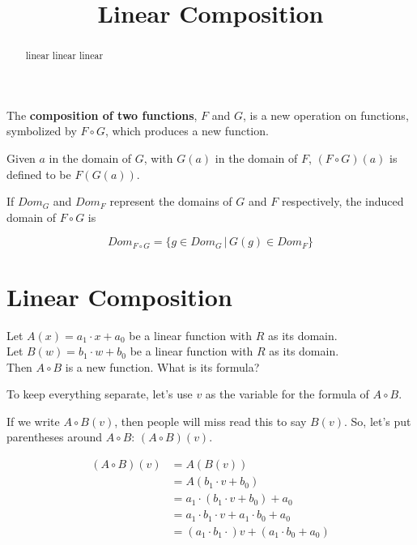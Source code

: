 \documentclass{ximera}
\title{Linear Composition}
\begin{document}
\begin{abstract}
linear linear linear
\end{abstract}
\maketitle


The \textbf{composition of two functions}, $F$ and $G$, is a new operation on functions, symbolized by $F \circ G$, which produces a new function.


\begin{definition}
Given $a$ in the domain of $G$, with $G(a)$ in the domain of $F$, $(F \circ G)(a)$ is defined to be  $F(G(a))$.


If $Dom_G$ and $Dom_F$ represent the domains of $G$ and $F$ respectively, the induced domain of $F \circ G$ is 




\[  Dom_{F \circ G} = \{  g \in  Dom_G  \,   |   \,   G(g) \in Dom_F                 \}           \]

\end{definition}





\section{Linear Composition}




Let $A(x) = a_1 \cdot x + a_0$ be a linear function with \textbf{$R$} as its domain. \\
Let $B(w) = b_1 \cdot w + b_0$ be a linear function with \textbf{$R$} as its domain. \\


Then $A \circ B$ is a new function. What is its formula?

To keep everything separate, let's use $v$ as the variable for the formula of $A \circ B$.


If we write $A \circ B(v)$, then people will miss read this to say $B(v)$.  So, let's put parentheses around $A \circ B$: $(A \circ B)(v)$.







\begin{align*}
(A \circ B)(v) & = A(B(v)) \\
& = A(b_1 \cdot v + b_0)  \\
& = a_1 \cdot (b_1 \cdot v + b_0) + a_0  \\
& = a_1 \cdot b_1 \cdot v + a_1 \cdot b_0 + a_0    \\
& = (a_1 \cdot b_1 \cdot) v + (a_1 \cdot b_0 + a_0)
\end{align*}
\end{document}
